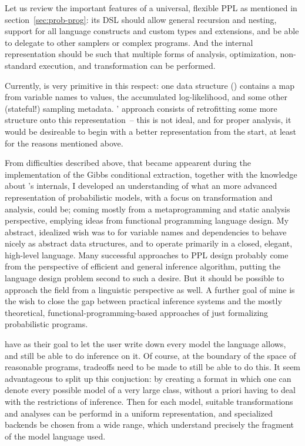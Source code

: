 Let us review the important features of a universal, flexible PPL as mentioned in
section~\ref{sec:prob-prog}: its DSL should allow general recursion and nesting, support for all
language constructs and custom types and extensions, and be able to delegate to other samplers or
complex programs.  And the internal representation should be such that multiple forms of analysis,
optimization, non-standard execution, and transformation can be performed.

Currently, \turingjl{} is very primitive in this respect: one data structure ()
contains a map from variable names to values, the accumulated log-likelihood, and some other
(stateful!) sampling metadata. \autogibbsjl{}' approach consists of retrofitting some more structure
onto this representation~-- this is not ideal, and for proper analysis, it would be desireable to
begin with a better representation from the start, at least for the reasons mentioned above.

From difficulties described above, that became appearent during the implementation of the Gibbs
conditional extraction, together with the knowledge about \dppljl{}'s internals, I developed an
understanding of what an more advanced representation of probabilistic models, with a focus on
transformation and analysis, could be; coming mostly from a metaprogramming and static analysis
perspective, emplying ideas from functional programming language design.  My abstract, idealized
wish was to for variable names and dependencies to behave nicely as abstract data structures, and to
operate primarily in a closed, elegant, high-level language.  Many successful approaches to PPL
design probably come from the perspective of efficient and general inference algorithm, putting the
language design problem second to such a desire.  But it should be possible to approach the field
from a linguistic perspective as well.  A further goal of mine is the wish to close the gap between
practical inference systems and the mostly theoretical, functional-programming-based approaches of
just formalizing probabilistic programs.

 have as their goal to let the user write down every model the language
allows, and still be able to do inference on it.  Of course, at the boundary of the space of
reasonable programs, tradeoffs need to be made to still be able to do this.  It seem advantageous to
split up this conjuction: by creating a format in which one can denote every possible model of a
very large class, without a priori having to deal with the restrictions of inference.  Then for each
model, suitable transformations and analyses can be performd in a uniform representation, and
specialized backends be chosen from a wide range, which understand precisely the fragment of the
model language used.

